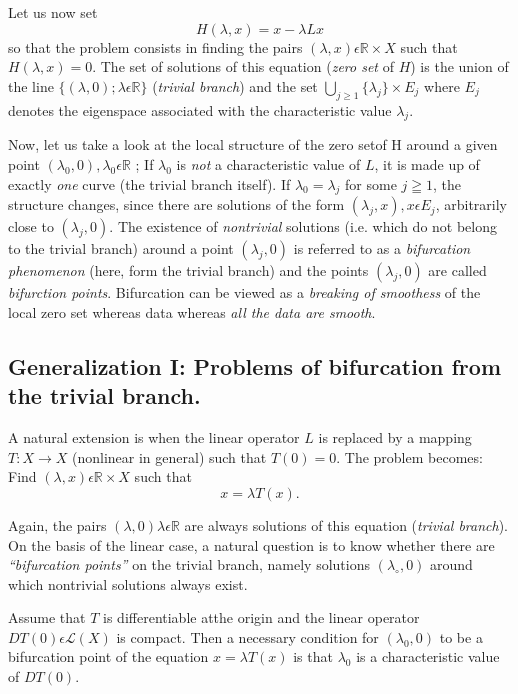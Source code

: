 Let us now set
$$
H(\lambda, x) = x - \lambda L x
$$
so that the problem consists in finding the pairs $(\lambda, x) \epsilon \mathbb{R} \times X$ such that $H(\lambda, x) = 0$. The set of solutions of this equation ({\em zero set} of $H$) is the union of the line $\{(\lambda, 0) ; \lambda \epsilon \mathbb{R} \}$ ({\em trivial branch}) and the set $\bigcup\limits_{j \geq 1} \{\lambda_{j}\} \times E_{j}$ where $E_{j}$ denotes the eigenspace associated with the characteristic value $\lambda_{j}$.

Now, let us take a look at the local structure of the zero set\pageoriginale of H around a given point $(\lambda_{0}, 0), \lambda_{0} \epsilon \mathbb{R}$ ; If $\lambda_{0}$ is {\em not} a characteristic value of $L$, it is made up of exactly {\em one} curve (the trivial branch itself). If $\lambda_{0} = \lambda_{j}$ for some $j \geqq 1$, the structure changes, since there are solutions of the form $(\lambda_{j}, x), x \epsilon E_{j}$, arbitrarily close to $(\lambda_{j}, 0)$. The existence of {\em nontrivial} solutions (i.e. which do not belong to the trivial branch) around a point $(\lambda_{j}, 0)$ is referred to as a {\em bifurcation phenomenon} (here, form the trivial branch) and the points $(\lambda_{j}, 0)$ are called {\em bifurction points}. Bifurcation can be viewed as a {\em breaking of smoothess} of the local zero set whereas data whereas {\em all the data are smooth}.

\subsection{Generalization I: Problems of bifurcation from the trivial branch.}\label{chap1-subsec1.1b}

A natural extension is when the linear operator $L$ is replaced by a mapping $T : X \to X$ (nonlinear in general) such that $T(0) = 0$. The problem becomes: Find $(\lambda, x) \epsilon \mathbb{R} \times X$ such that
$$
x = \lambda T(x).
$$

Again, the pairs $(\lambda, 0) \lambda \epsilon \mathbb{R}$ are always solutions of this equation ({\em trivial branch}). On the basis of the linear case, a natural question is to know whether there are {\em ``bifurcation points''} on the trivial branch, namely solutions $(\lambda_{\circ}, 0)$ around which nontrivial solutions always exist.

\begin{theorem}\label{chap1-thm1.1}
 Assume that $T$ is differentiable at\pageoriginale the origin and the linear operator $DT(0) \epsilon \mathscr{L} (X)$ is compact. Then a necessary condition for $(\lambda_{0}, 0)$ to be a bifurcation point of the equation $x = \lambda T(x)$ is that $\lambda_{0}$ is a characteristic value of $DT(0)$.
\end{theorem}

